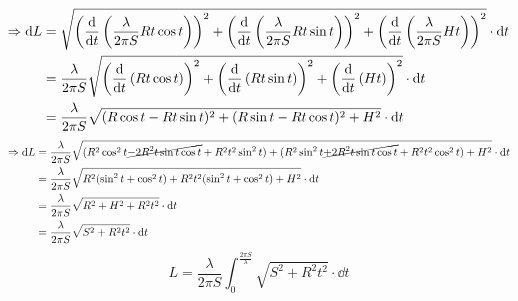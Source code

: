 \begin{align*}
    \Rightarrow \dd{L} & = \sqrt{\left(\dv{t}\left(\frac{\lambda}{2\pi S}Rt\cos{t}\right)\right)^2+\left(\dv{t}\left(\frac{\lambda}{2\pi S}Rt\sin{t}\right)\right)^2+\left(\dv{t}\left(\frac{\lambda}{2\pi S}Ht\right)\right)^2} \cdot \dd{t} \\
           &= \frac{\lambda}{2\pi S}\sqrt{\left(\dv{t}\left(Rt\cos{t}\right)\right)^2+\left(\dv{t}\left(Rt\sin{t}\right)\right)^2+\left(\dv{t}\left(Ht\right)\right)^2} \cdot \dd{t} \\
           &= \frac{\lambda}{2\pi S}\sqrt{(R\cos{t}-Rt\sin{t})^2+(R\sin{t}-Rt\cos{t})^2+H^2} \cdot \dd{t}
\end{align*}
\begin{align}
    \Rightarrow \dd{L} &= \frac{\lambda}{2\pi S}\sqrt{(R^2\cos^2{t}\cancel{-2R^2t\sin{t}\cos{t}}+R^2t^2\sin^2{t})+(R^2\sin^2{t}\cancel{+2R^2t\sin{t}\cos{t}}+R^2t^2\cos^2{t})+H^2} \cdot \dd{t} \notag \\ 
     &= \frac{\lambda}{2\pi S}\sqrt{R^2(\sin^2{t} + \cos^2{t})+ R^2t^2(\sin^2{t}+\cos^2{t})+H^2} \cdot \dd{t} \notag \\ 
     &= \frac{\lambda}{2\pi S}\sqrt{R^2 +H^2 + R^2t^2} \cdot \dd{t} \notag \\ 
     &= \frac{\lambda}{2\pi S}\sqrt{S^2 + R^2t^2} \cdot \dd{t} 
\end{align}
\begin{equation}
    L = \frac{\lambda}{2\pi S}\int_0^\frac{2\pi S}{\lambda} \sqrt{S^2 + R^2t^2} \cdot \dd{t} \label{eq:integral}
\end{equation}
